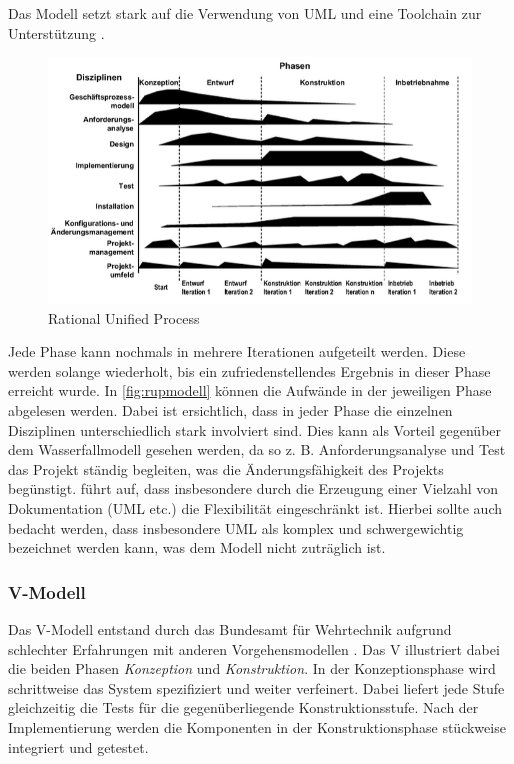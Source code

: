 Das Modell setzt stark auf die Verwendung von UML und eine Toolchain zur Unterstützung \parencite[vgl.][]{Kruchten:2002:TIR:581339.581455}.

\begin{figure}
  \centering
  \includegraphics[width=\textwidth]{img/rupmodell.png}
  \caption{Rational Unified Process \parencite[][]{Kleuker:2011aa}}
  \label{fig:rupmodell}
\end{figure}

Jede Phase kann nochmals in mehrere Iterationen aufgeteilt werden. 
Diese werden solange wiederholt, bis ein zufriedenstellendes Ergebnis in dieser Phase erreicht wurde.
In \autoref{fig:rupmodell} können die Aufwände in der jeweiligen Phase abgelesen werden. 
Dabei ist ersichtlich, dass in jeder Phase die einzelnen Disziplinen unterschiedlich stark involviert sind.
Dies kann als Vorteil gegenüber dem Wasserfallmodell gesehen werden, da so z. B. Anforderungsanalyse und Test das Projekt ständig begleiten, was die Änderungsfähigkeit des Projekts begünstigt.
\parencite[][S. 60]{Schatten:2010aa} führt auf, dass insbesondere durch die Erzeugung einer Vielzahl von Dokumentation (UML etc.) die Flexibilität eingeschränkt ist.
Hierbei sollte auch bedacht werden, dass insbesondere UML als komplex und schwergewichtig bezeichnet werden kann, was dem Modell nicht zuträglich ist.

\subsubsection{V-Modell}

Das V-Modell entstand durch das Bundesamt für Wehrtechnik aufgrund schlechter Erfahrungen mit anderen Vorgehensmodellen \parencite[vgl.][S. 1]{droschel2000v}.
Das V illustriert dabei die beiden Phasen \emph{Konzeption} und \emph{Konstruktion}.
In der Konzeptionsphase wird schrittweise das System spezifiziert und weiter verfeinert. 
Dabei liefert jede Stufe gleichzeitig die Tests für die gegenüberliegende Konstruktionsstufe.
Nach der Implementierung werden die Komponenten in der Konstruktionsphase stückweise integriert und getestet.

